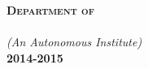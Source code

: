 \begin{titlepage}
\begin{center}
\textbf{\large{\textsc{Department of \deptname}}}\\ %
 
\textbf{\textsc{\large {\univname}}}\\ %
\textit{\large{(An Autonomous Institute)}}\\[0.3cm]

\textbf{\Large 2014-2015}\\[1cm] %
 
\vfill
\end{center}

\end{titlepage}
